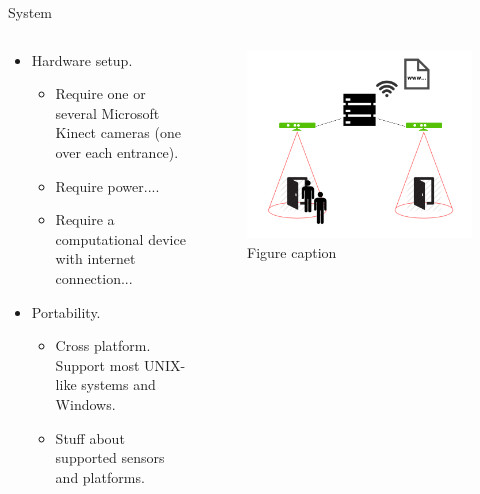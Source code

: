 \documentclass[final,hyperref={pdfpagelabels=false}]{beamer}
\begin{document}
\begin{frame}[t]
\begin{columns}[t]
\begin{column}{.465\textwidth}


\begin{block}{System}

\begin{columns} %
\begin{column}{.54\textwidth} %
\begin{itemize}
\item Hardware setup.
\begin{itemize}
\item Require one or several Microsoft Kinect cameras (one over each entrance).
\item Require power....
\item Require a computational device with internet connection...
\end{itemize}
\item Portability.
\begin{itemize}
\item Cross platform. Support most UNIX-like systems and Windows.
\item Stuff about supported sensors and platforms.
\end{itemize}
\end{itemize}
\end{column}

\begin{column}{.43\textwidth} %
\centering
\begin{figure}
\includegraphics[width=1.0\linewidth]{system_overview.png}
\caption{Figure caption}
\end{figure}
\end{column}
\end{columns} %


\end{block}
\end{column}
\end{columns}
\end{frame}
\end{document}
